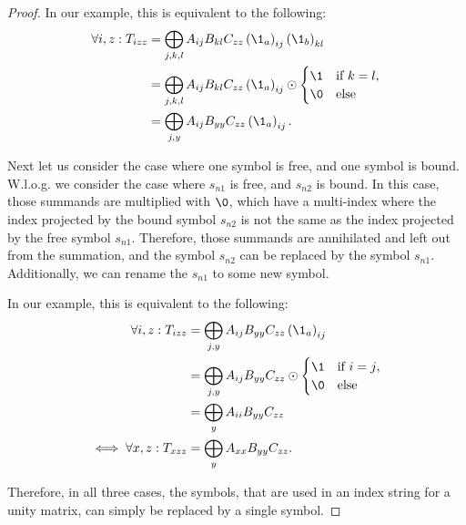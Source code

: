 \begin{proof}
    In our example, this is equivalent to the following:
    \begin{align*}
        \forall i,z: T_{izz} & = \bigoplus\limits_{j,k,l} A_{ij} B_{kl} C_{zz} \left(\1_a\right)_{ij} \left(\1_b\right)_{kl}          \\
                             & = \bigoplus\limits_{j,k,l} A_{ij} B_{kl} C_{zz} \left(\1_a\right)_{ij} \odot \begin{cases}
            \1 & \text{if $k = l$}, \\
            \0 & \text{else}
        \end{cases} \\
                             & = \bigoplus\limits_{j,y} A_{ij} B_{yy} C_{zz} \left(\1_a\right)_{ij}.
    \end{align*}

    Next let us consider the case where one symbol is free, and one symbol is bound.
    W.l.o.g. we consider the case where $s_{n1}$ is free, and $s_{n2}$ is bound.
    In this case, those summands are multiplied with $\0$,
    which have a multi-index where the index projected by the bound symbol $s_{n2}$ is not the same as the index projected by the free symbol $s_{n1}$.
    Therefore, those summands are annihilated and left out from the summation, and the symbol $s_{n2}$ can be replaced by the symbol $s_{n1}$.
    Additionally, we can rename the $s_{n1}$ to some new symbol.

    In our example, this is equivalent to the following:
    \begin{align*}
        \forall i,z: T_{izz}      & = \bigoplus\limits_{j,y} A_{ij} B_{yy} C_{zz} \left(\1_a\right)_{ij}          \\
                                  & = \bigoplus\limits_{j,y} A_{ij} B_{yy} C_{zz} \odot \begin{cases}
            \1 & \text{if $i = j$}, \\
            \0 & \text{else}
        \end{cases} \\
                                  & = \bigoplus\limits_{y} A_{ii} B_{yy} C_{zz}                                   \\
        \iff \forall x,z: T_{xzz} & = \bigoplus\limits_{y} A_{xx} B_{yy} C_{zz}.
    \end{align*}

    Therefore, in all three cases, the symbols, that are used in an index string for a unity matrix, can simply be replaced by a single symbol.
\end{proof}